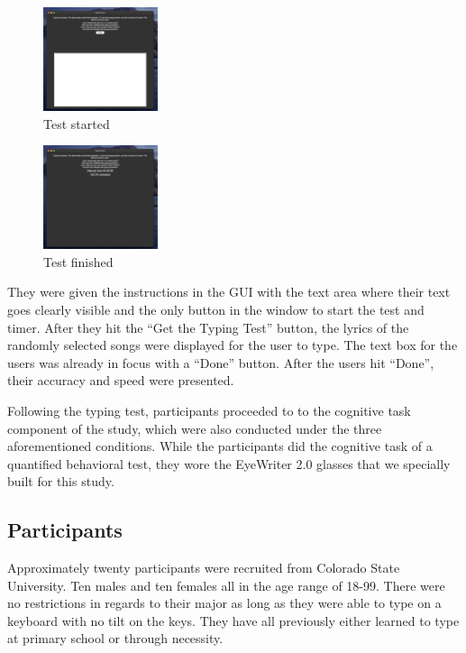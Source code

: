 \documentclass[manuscript, screen, review]{acmart} %
\begin{document}
  \begin{figure}
    \includegraphics[width=0.3\textwidth]{typing_test_2}
    \caption{Test started}
  \end{figure}

  \begin{figure}
    \includegraphics[width=0.3\textwidth]{typing_test_3}
    \caption{Test finished}
  \end{figure}

  They were given the instructions in the GUI with the text area where their text goes clearly visible and the only button in the window to start the test and timer. After they hit the ``Get the Typing Test'' button, the lyrics of the randomly selected songs were displayed for the user to type. The text box for the users was already in focus with a ``Done'' button. After the users hit ``Done'', their accuracy and speed were presented.

  Following the typing test, participants proceeded to to the cognitive task component of the study, which were also conducted under the three aforementioned conditions. While the participants did the cognitive task of a quantified behavioral test, they wore the EyeWriter 2.0 glasses that we specially built for this study.

  \subsection[short]{Participants}
  Approximately twenty participants were recruited from Colorado State University. Ten males and ten females all in the age range of 18-99. There were no %
  restrictions in regards to their major as long as they were able to type on a keyboard with no tilt on the keys.
  They have all previously either learned to type at primary school or through necessity.
\end{document}
